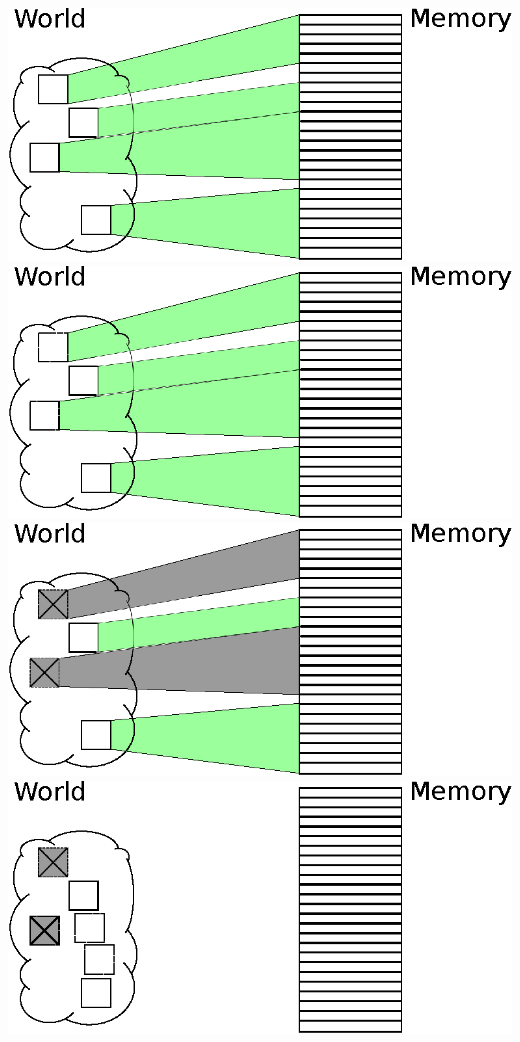 \documentclass{beamer}
\begin{document}
\begin{frame}
\begin{overprint}
    \includegraphics{World4.eps}
    \includegraphics{World5.eps}
    \includegraphics{World6.eps}
    \includegraphics{World7.eps}

\end{overprint}
\end{frame}
\end{document}
